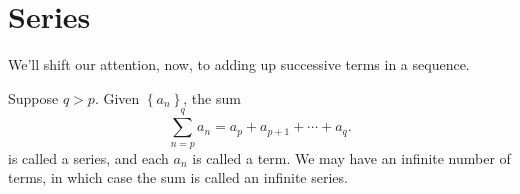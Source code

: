\documentclass[../m131main.tex]{subfiles}
\begin{document}







\section{Series}
We'll shift our attention, now, to adding up successive terms in a sequence.

\begin{definition}[Series]
    Suppose $q > p$.
    Given $\left\{ a_n \right\}$, the sum
    \[ \sum_{n=p}^{q} a_n = a_p + a_{p+1} + \cdots + a_q. \]
    is called a series, and each $a_n$ is called a term.
    We may have an infinite number of terms, in which case the sum is called an infinite series.
\end{definition}
\end{document}
